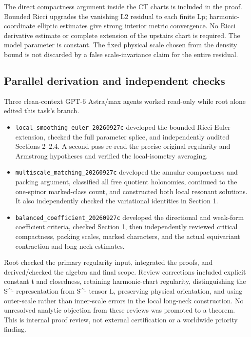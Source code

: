 \documentclass[
  10pt,
]{article}
\providecommand{\tightlist}{%
  \setlength{\itemsep}{0pt}\setlength{\parskip}{0pt}}
\begin{document}
The direct compactness argument inside the CT charts is included in the
proof. Bounded Ricci upgrades the vanishing L2 residual to each finite
Lp; harmonic-coordinate elliptic estimates give strong interior metric
convergence. No Ricci derivative estimate or complete extension of the
upstairs chart is required. The model parameter is constant. The fixed
physical scale chosen from the density bound is not discarded by a false
scale-invariance claim for the entire residual.

\hypertarget{parallel-derivation-and-independent-checks}{%
\subsection{Parallel derivation and independent
checks}\label{parallel-derivation-and-independent-checks}}

Three clean-context GPT-6 Astra/max agents worked read-only while root
alone edited this task's branch.

\begin{itemize}
\tightlist
\item
  \texttt{local\_smoothing\_euler\_20260927c} developed the
  bounded-Ricci Euler extension, checked the full parameter splice, and
  independently audited Sections 2--2.4. A second pass re-read the
  precise original regularity and Armstrong hypotheses and verified the
  local-isometry averaging.
\item
  \texttt{multiscale\_matching\_20260927c} developed the annular
  compactness and packing argument, classified all free quotient
  holonomies, continued to the one-spinor marked-class count, and
  constructed both local resonant solutions. It also independently
  checked the variational identities in Section 1.
\item
  \texttt{balanced\_coefficient\_20260927c} developed the directional
  and weak-form coefficient criteria, checked Section 1, then
  independently reviewed critical compactness, packing scales, marked
  characters, and the actual equivariant contraction and long-neck
  estimates.
\end{itemize}

Root checked the primary regularity input, integrated the proofs, and
derived/checked the algebra and final scope. Review corrections included
explicit constant t and closedness, retaining harmonic-chart regularity,
distinguishing the S\^{}- representation from S\^{}- tensor L,
preserving physical orientation, and using outer-scale rather than
inner-scale errors in the local long-neck construction. No unresolved
analytic objection from these reviews was promoted to a theorem. This is
internal proof review, not external certification or a worldwide
priority finding.
\end{document}
